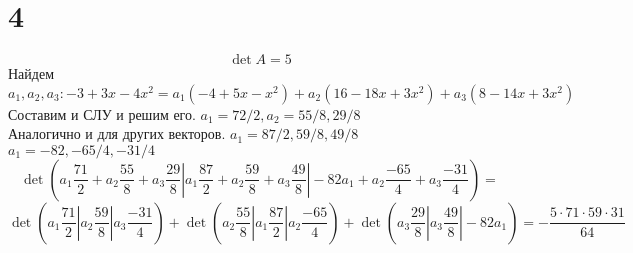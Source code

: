 \section*{4}
$$\det A = 5$$
Найдем $a_1, a_2, a_3: -3+3x-4x^2 = a_1(-4+5x-x^2)+ a_2(16-18x+3x^2) +a_3(8-14x+3x^2)$
Составим и СЛУ и решим его. $a_1 = 72/2, a_2 = 55/8, 29/8$\\
Аналогично и для других векторов. 
$a_1 = 87/2, 59/8, 49/8$\\
$a_1 = -82, -65/4, -31/4$\\
$$\det(a_1\frac{71}{2} + a_2\frac{55}{8} +a_3\frac{29}{8} |a_1\frac{87}{2} + a_2\frac{59}{8} +a_3\frac{49}{8}| -82a_1 + a_2\frac{-65}{4} +a_3\frac{-31}{4} ) = $$
$$\det(a_1\frac{71}{2}| a_2\frac{59}{8} |a_3\frac{-31}{4} ) +\det( a_2\frac{55}{8}| a_1\frac{87}{2}| a_2\frac{-65}{4} ) +  \det( a_3\frac{29}{8} |a_3\frac{49}{8}| -82a_1  ) = -\frac{5\cdot71\cdot59\cdot31}{64} $$
